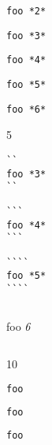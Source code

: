 \texttt{foo *2*}

\begin{verbatim}
foo *3*
\end{verbatim}

\begin{verbatim}
foo *4*
\end{verbatim}

\begin{verbatim}
foo *5*
\end{verbatim}

\begin{verbatim}
foo *6*
\end{verbatim}

5

\begin{verbatim}
``
foo *3*
``
\end{verbatim}

\begin{verbatim}
```
foo *4*
```
\end{verbatim}

\begin{verbatim}
````
foo *5*
````
\end{verbatim}

\begin{verbatim}
\end{verbatim}

foo \emph{6}

\begin{verbatim}
\end{verbatim}

10

\begin{lstlisting}[language=perl]
foo
\end{lstlisting}

\begin{lstlisting}[language=perl]
foo
\end{lstlisting}

\begin{lstlisting}[language=perl]
foo
\end{lstlisting}

